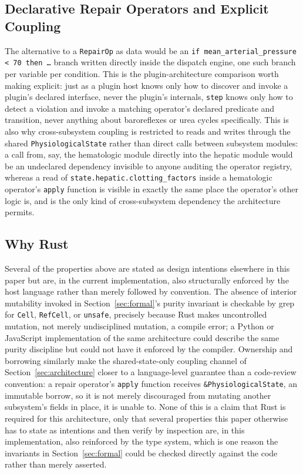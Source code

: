 \documentclass[11pt]{article}
\begin{document}
\subsection{Declarative Repair Operators and Explicit Coupling}

The alternative to a \texttt{RepairOp} as data would be an \texttt{if mean\_arterial\_pressure < 70 then \ldots} branch written directly inside the dispatch engine, one such branch per variable per condition. This is the plugin-architecture comparison worth making explicit: just as a plugin host knows only how to discover and invoke a plugin's declared interface, never the plugin's internals, \texttt{step} knows only how to detect a violation and invoke a matching operator's declared predicate and transition, never anything about baroreflexes or urea cycles specifically. This is also why cross-subsystem coupling is restricted to reads and writes through the shared \texttt{PhysiologicalState} rather than direct calls between subsystem modules: a call from, say, the hematologic module directly into the hepatic module would be an undeclared dependency invisible to anyone auditing the operator registry, whereas a read of \texttt{state.hepatic.clotting\_factors} inside a hematologic operator's \texttt{apply} function is visible in exactly the same place the operator's other logic is, and is the only kind of cross-subsystem dependency the architecture permits.

\subsection{Why Rust}

Several of the properties above are stated as design intentions elsewhere in this paper but are, in the current implementation, also structurally enforced by the host language rather than merely followed by convention. The absence of interior mutability invoked in Section~\ref{sec:formal}'s purity invariant is checkable by grep for \texttt{Cell}, \texttt{RefCell}, or \texttt{unsafe}, precisely because Rust makes uncontrolled mutation, not merely undisciplined mutation, a compile error; a Python or JavaScript implementation of the same architecture could describe the same purity discipline but could not have it enforced by the compiler. Ownership and borrowing similarly make the shared-state-only coupling channel of Section~\ref{sec:architecture} closer to a language-level guarantee than a code-review convention: a repair operator's \texttt{apply} function receives \texttt{\&PhysiologicalState}, an immutable borrow, so it is not merely discouraged from mutating another subsystem's fields in place, it is unable to. None of this is a claim that Rust is required for this architecture, only that several properties this paper otherwise has to state as intentions and then verify by inspection are, in this implementation, also reinforced by the type system, which is one reason the invariants in Section~\ref{sec:formal} could be checked directly against the code rather than merely asserted.
\end{document}

